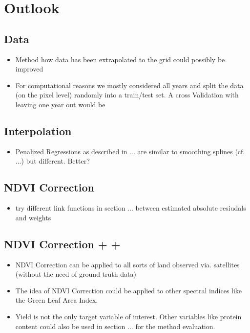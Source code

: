 \chapter{Outlook}

\section{Data}
\begin{itemize}
    \item Method how data has been extrapolated to the grid could possibly be improved
    \item For computational reasons we mostly considered all years and split the data (on the pixel level) randomly into a train/test set. A cross Validation with leaving one year out would be 
\end{itemize}    

\section{Interpolation}
\begin{itemize}
    \item Penalized Regressions as described in ... are similar to smoothing splines (cf. ...) but different. Better?
\end{itemize}    

\section{NDVI Correction}
\begin{itemize}
    \item try different link functions in section ... between estimated absolute resiudals and weights
\end{itemize}    


\section{NDVI Correction + +}
\begin{itemize}
    \item NDVI Correction can be applied to all sorts of land observed via. satellites (without the need of ground truth data)
    \item The idea of NDVI Correction could be applied to other spectral indices like the Green Leaf Area Index.
    \item Yield is not the only target variable of interest. Other variables like protein content could also be used in section ... for the method evaluation. 
\end{itemize}    
